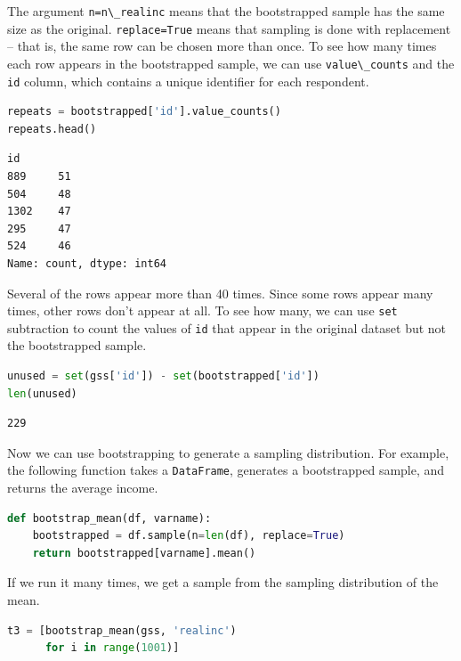 The argument \passthrough{\lstinline!n=n\_realinc!} means that the
bootstrapped sample has the same size as the original.
\passthrough{\lstinline!replace=True!} means that sampling is done with
replacement -- that is, the same row can be chosen more than once. To
see how many times each row appears in the bootstrapped sample, we can
use \passthrough{\lstinline!value\_counts!} and the
\passthrough{\lstinline!id!} column, which contains a unique identifier
for each respondent.

\begin{lstlisting}[language=Python,style=source]
repeats = bootstrapped['id'].value_counts()
repeats.head()
\end{lstlisting}

\begin{lstlisting}[style=output]
id
889     51
504     48
1302    47
295     47
524     46
Name: count, dtype: int64
\end{lstlisting}

Several of the rows appear more than 40 times. Since some rows appear
many times, other rows don't appear at all. To see how many, we can use
\passthrough{\lstinline!set!} subtraction to count the values of
\passthrough{\lstinline!id!} that appear in the original dataset but not
the bootstrapped sample.

\begin{lstlisting}[language=Python,style=source]
unused = set(gss['id']) - set(bootstrapped['id'])
len(unused)
\end{lstlisting}

\begin{lstlisting}[style=output]
229
\end{lstlisting}

Now we can use bootstrapping to generate a sampling distribution. For
example, the following function takes a
\passthrough{\lstinline!DataFrame!}, generates a bootstrapped sample,
and returns the average income.

\begin{lstlisting}[language=Python,style=source]
def bootstrap_mean(df, varname):
    bootstrapped = df.sample(n=len(df), replace=True)
    return bootstrapped[varname].mean()
\end{lstlisting}

If we run it many times, we get a sample from the sampling distribution
of the mean.

\begin{lstlisting}[language=Python,style=source]
t3 = [bootstrap_mean(gss, 'realinc')
      for i in range(1001)]
\end{lstlisting}

